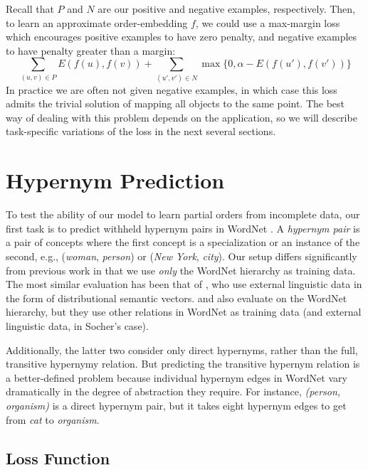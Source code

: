 \documentclass{article} \usepackage{iclr2016_conference,times}
\begin{document}
Recall that $P$ and $N$ are our positive and negative examples, respectively. Then, to learn an approximate order-embedding $f$, we could use a max-margin loss which encourages positive examples to have zero penalty, and negative examples to have penalty greater than a margin:
\begin{equation} \sum_{(u,v) \in P} E(f(u), f(v))   + \sum_{(u',v') \in N} \max\{0, \alpha - E(f(u'), f(v')) \}  \label{eq:pos} \end{equation}
In practice we are often not given negative examples, in which case this loss admits the trivial solution of mapping all objects to the same point. The best way of dealing with this problem depends on the application, so we will describe task-specific variations of the loss in the next several sections. %
 
\section{Hypernym Prediction}
\label{hypernyms}

To test the ability of our model to learn partial orders from incomplete data,  our first task is to predict withheld hypernym pairs in WordNet \citep{miller1995wordnet}. A {\it hypernym pair} is a pair of concepts  where the first concept is a specialization or an  instance of the second, e.g., (\emph{woman}, \emph{person}) or (\emph{New York}, \emph{city}).
 Our setup differs significantly from previous work in that we use \emph{only} the WordNet hierarchy as training data. The most similar evaluation has been that of \citet{baroni2012entailment}, who use external linguistic data in the form of distributional semantic vectors. \citet{bordes2011learning} and \citet{socher2013reasoning} also evaluate on the WordNet hierarchy, but they use other relations in WordNet as training data  (and external linguistic data, in Socher's case). 
 
 Additionally, the latter two consider only direct hypernyms, rather than the full, transitive hypernymy relation. But predicting the transitive hypernym relation is a better-defined problem because individual hypernym edges in WordNet vary dramatically in the degree of abstraction they require. For instance, \emph{(person, organism)} is a direct hypernym pair, but it takes eight hypernym edges to get from \emph{cat} to \emph{organism}.

\subsection{Loss Function}
\vspace{-0.5mm}
\end{document}
